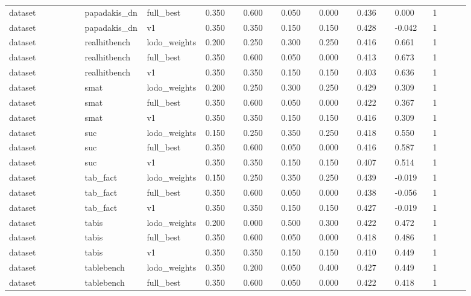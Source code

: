 \begin{landscape}
\begin{longtable}{p{0.162\linewidth}p{0.081\linewidth}p{0.081\linewidth}p{0.081\linewidth}p{0.081\linewidth}p{0.081\linewidth}p{0.081\linewidth}p{0.081\linewidth}p{0.081\linewidth}p{0.081\linewidth}}
dataset & papadakis\_\allowbreak{}dn & full\_\allowbreak{}best & 0.350 & 0.600 & 0.050 & 0.000 & 0.436 & 0.000 & 1 \\
dataset & papadakis\_\allowbreak{}dn & v1 & 0.350 & 0.350 & 0.150 & 0.150 & 0.428 & -0.042 & 1 \\
dataset & realhitbench & lodo\_\allowbreak{}weights & 0.200 & 0.250 & 0.300 & 0.250 & 0.416 & 0.661 & 1 \\
dataset & realhitbench & full\_\allowbreak{}best & 0.350 & 0.600 & 0.050 & 0.000 & 0.413 & 0.673 & 1 \\
dataset & realhitbench & v1 & 0.350 & 0.350 & 0.150 & 0.150 & 0.403 & 0.636 & 1 \\
dataset & smat & lodo\_\allowbreak{}weights & 0.200 & 0.250 & 0.300 & 0.250 & 0.429 & 0.309 & 1 \\
dataset & smat & full\_\allowbreak{}best & 0.350 & 0.600 & 0.050 & 0.000 & 0.422 & 0.367 & 1 \\
dataset & smat & v1 & 0.350 & 0.350 & 0.150 & 0.150 & 0.416 & 0.309 & 1 \\
dataset & suc & lodo\_\allowbreak{}weights & 0.150 & 0.250 & 0.350 & 0.250 & 0.418 & 0.550 & 1 \\
dataset & suc & full\_\allowbreak{}best & 0.350 & 0.600 & 0.050 & 0.000 & 0.416 & 0.587 & 1 \\
dataset & suc & v1 & 0.350 & 0.350 & 0.150 & 0.150 & 0.407 & 0.514 & 1 \\
dataset & tab\_\allowbreak{}fact & lodo\_\allowbreak{}weights & 0.150 & 0.250 & 0.350 & 0.250 & 0.439 & -0.019 & 1 \\
dataset & tab\_\allowbreak{}fact & full\_\allowbreak{}best & 0.350 & 0.600 & 0.050 & 0.000 & 0.438 & -0.056 & 1 \\
dataset & tab\_\allowbreak{}fact & v1 & 0.350 & 0.350 & 0.150 & 0.150 & 0.427 & -0.019 & 1 \\
dataset & tabis & lodo\_\allowbreak{}weights & 0.200 & 0.000 & 0.500 & 0.300 & 0.422 & 0.472 & 1 \\
dataset & tabis & full\_\allowbreak{}best & 0.350 & 0.600 & 0.050 & 0.000 & 0.418 & 0.486 & 1 \\
dataset & tabis & v1 & 0.350 & 0.350 & 0.150 & 0.150 & 0.410 & 0.449 & 1 \\
dataset & tablebench & lodo\_\allowbreak{}weights & 0.350 & 0.200 & 0.050 & 0.400 & 0.427 & 0.449 & 1 \\
dataset & tablebench & full\_\allowbreak{}best & 0.350 & 0.600 & 0.050 & 0.000 & 0.422 & 0.418 & 1 \\

\end{longtable}
\end{landscape}
